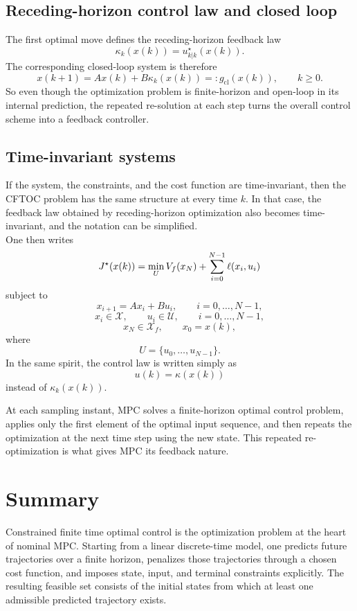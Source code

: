 \subsection{Receding-horizon control law and closed loop}

The first optimal move defines the receding-horizon feedback law
\[
\kappa_k(x(k)) = u_{k|k}^\star(x(k)).
\]
The corresponding closed-loop system is therefore
\[
x(k+1)=Ax(k)+B\kappa_k(x(k))=:g_{\mathrm{cl}}(x(k)),
\qquad k\ge 0.
\]
So even though the optimization problem is finite-horizon and open-loop in its internal
prediction, the repeated re-solution at each step turns the overall control scheme into a
feedback controller.

\subsection{Time-invariant systems}

If the system, the constraints, and the cost function are time-invariant, then the CFTOC
problem has the same structure at every time \(k\). In that case, the feedback law obtained by
receding-horizon optimization also becomes time-invariant, and the notation can be simplified.\\
One then writes
\[
J^\star(x(k))
=
\min_U
V_f(x_N)
+
\sum_{i=0}^{N-1}\ell(x_i,u_i)
\]
subject to
\[
x_{i+1}=Ax_i+Bu_i,\qquad i=0,\dots,N-1,
\]
\[
x_i\in\mathcal X,\qquad u_i\in\mathcal U,\qquad i=0,\dots,N-1,
\]
\[
x_N\in\mathcal X_f,
\qquad
x_0=x(k),
\]
where
\[
U=\{u_0,\dots,u_{N-1}\}.
\]
In the same spirit, the control law is written simply as
\[
u(k)=\kappa(x(k))
\]
instead of \(\kappa_k(x(k))\).

\begin{theorembox}
At each sampling instant, MPC solves a finite-horizon optimal control problem, applies only the
first element of the optimal input sequence, and then repeats the optimization at the next time
step using the new state. This repeated re-optimization is what gives MPC its feedback nature.
\end{theorembox}
\section{Summary}

Constrained finite time optimal control is the optimization problem at the heart of nominal
MPC. Starting from a linear discrete-time model, one predicts future trajectories over a finite
horizon, penalizes those trajectories through a chosen cost function, and imposes state, input,
and terminal constraints explicitly. The resulting feasible set consists of the initial states from
which at least one admissible predicted trajectory exists.\\

